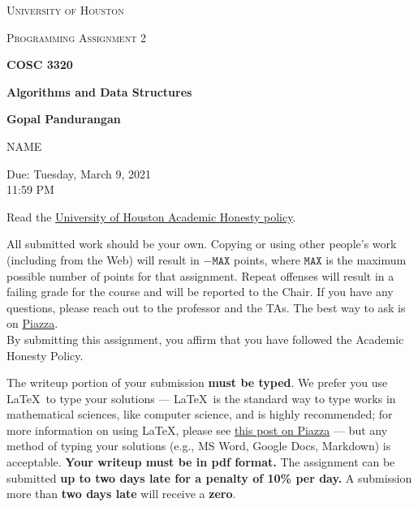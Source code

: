 \documentclass[draft]{article}
\begin{document}
\begin{titlepage}
    \begin{center}
        {\scshape\LARGE University of Houston\par}
        \vspace{1cm}
        {\scshape\Large Programming Assignment 2 \par}
        \vspace{1.5cm}
        {\huge\bfseries COSC 3320 \par}
        {\huge\bfseries Algorithms and Data Structures \par}
        \vspace{0.5cm}
        {\large\bfseries Gopal Pandurangan\par}
        \vspace{2cm}
        {\Large NAME\par}
        \vspace{0.5cm}
        {\large \par} Due: Tuesday, March 9, 2021\\11:59 PM
    \end{center}


    Read the \href{https://www.uh.edu/provost/policies-resources/honesty/_documents-honesty/academic-honesty-policy.pdf}{University of Houston Academic Honesty policy}.

    \begin{tcolorbox}[title=Academic Honesty Policy,colback=red!15,colframe=red!65!black,fonttitle=\bfseries]All submitted work should be your own. Copying or using other people's work (including from the Web) will result in \(-\texttt{MAX}\) points, where \(\texttt{MAX}\) is the maximum possible number of points for that assignment. Repeat offenses will result in a failing grade for the course and will be reported to the Chair. If you have any questions, please reach out to the professor and the TAs. The best way to ask is on \href{https://piazza.com/uh/spring2021/cosc3320/home}{Piazza}.\\

        By submitting this assignment, you affirm that you have followed the Academic Honesty Policy.
    \end{tcolorbox}

    The writeup portion of your submission \textbf{must be typed}. We prefer you use \LaTeX~to type your solutions --- \LaTeX~is the standard way to type works in mathematical sciences, like computer science, and is highly recommended; for more information on using \LaTeX, please see \href{https://piazza.com/class/kjxhee6ctqe6cj?cid=8}{this post on Piazza} --- but any method of typing your solutions (e.g., MS Word, Google Docs, Markdown) is acceptable. \textbf{Your writeup must be in pdf format.} The assignment can be submitted \textbf{up to two days late for a penalty of 10\% per day.} A submission more than \textbf{two days late} will receive a \textbf{zero}.


\end{titlepage}
\end{document}

